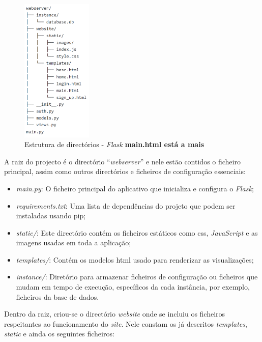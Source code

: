 \begin{figure}[hbtp]
	\centering
	\includegraphics[width=0.3\textwidth]{figures/tree_flask.png}
	\caption{Estrutura de directórios - \textit{Flask} \textbf{ main.html está a mais}}
	\label{fig:estruturapastas}
\end{figure}

A raiz do projecto é o directório ``\textit{webserver}'' e nele estão contidos o ficheiro principal, assim como outros directórios e ficheiros de configuração essenciais:
\begin{itemize}
	\item \textit{main.py}: O ficheiro principal do aplicativo que inicializa e configura o \textit{Flask};
	\item \textit{requirements.txt}: Uma lista de dependências do projeto que podem ser instaladas usando \gls{pip};
	\item \textit{static/}: Este directório contém os ficheiros estáticos como \acrshort{css}, \textit{JavaScript} e as imagens usadas em toda a aplicação;
	\item \textit{templates/}: Contém os modelos \acrshort{html} usado para renderizar as visualizações;
	\item \textit{instance/}: Diretório para armazenar ficheiros de configuração ou ficheiros que mudam em tempo de execução, específicos da cada instância, por exemplo, ficheiros da base de dados.
\end{itemize}

Dentro da raiz, criou-se o directório \textit{website} onde se incluiu os ficheiros respeitantes ao funcionamento do \textit{site}. Nele constam os já descritos \textit{templates}, \textit{static} e ainda os seguintes ficheiros:

